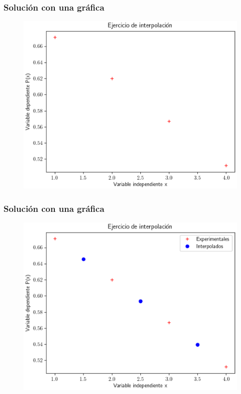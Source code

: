 \documentclass[12pt]{beamer}
\begin{document}
\begin{frame}
\frametitle{Solución con una gráfica}
\begin{figure}
	\centering
	\includegraphics[scale=0.58]{Imagenes/Ejercicio_Interpolacion_01.eps}
\end{figure}
\end{frame}
\begin{frame}
\frametitle{Solución con una gráfica}
\begin{figure}
	\centering
	\includegraphics[scale=0.58]{Imagenes/Ejercicio_Interpolacion_02.eps}
\end{figure}
\end{frame}
\end{document}
